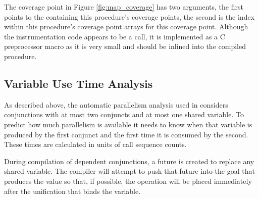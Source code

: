 The coverage point in Figure \ref{fig:map_coverage}
has two arguments,
the first points to the \PS containing this procedure's coverage points,
the second is the index within this procedure's coverage point arrays
for this coverage point.
Although the instrumentation code appears to be a call,
it is implemented as a C preprocessor macro as it is very small and should
be inlined into the compiled procedure.


\subsection{Variable Use Time Analysis}
\label{sec:var_use_time}

As described above,
the automatic parallelism analysis used in \citet{bone:2008:hons} considers
conjunctions with at most two conjuncts and at most one shared variable.
To predict how much parallelism is available it needs to know
when that variable is produced by the first conjunct
and the first time it is consumed by the second.
These times are calculated in units of call sequence counts.

During compilation of dependent conjunctions,
a future is created to replace any shared variable.
The compiler will attempt to push that future into the goal that
produces the value so that,
if possible,
the \signal operation will be placed immediately after the unification
that binds the variable.

